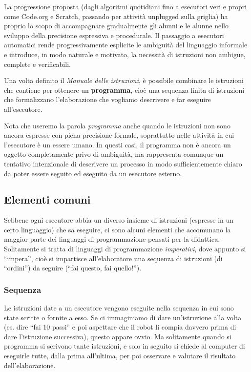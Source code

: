 La progressione proposta (dagli algoritmi quotidiani fino a esecutori veri e propri come Code.org e Scratch, passando per attività unplugged sulla griglia) ha proprio lo scopo di accompagnare gradualmente gli alunni e le alunne nello sviluppo della precisione espressiva e procedurale. Il passaggio a esecutori automatici rende progressivamente esplicite le ambiguità del linguaggio informale e introduce, in modo naturale e motivato, la necessità di istruzioni non ambigue, complete e verificabili.

Una volta definito il \emph{Manuale delle istruzioni}, è possibile combinare le istruzioni che contiene per ottenere un \textbf{programma}, cioè una sequenza finita di istruzioni che formalizzano l'elaborazione che vogliamo descrivere e far eseguire all'esecutore.

Nota che useremo la parola \textit{programma} anche quando le istruzioni non sono ancora espresse con piena precisione formale, soprattutto nelle attività in cui l'esecutore è un essere umano. In questi casi, il programma non è ancora un oggetto completamente privo di ambiguità, ma rappresenta comunque un tentativo intenzionale di descrivere un processo in modo sufficientemente chiaro da poter essere seguito ed eseguito da un esecutore esterno.

\subsection{Elementi comuni }\label{elementi-comuni}


Sebbene ogni esecutore abbia un diverso insieme di istruzioni (espresse in un certo linguaggio) che sa eseguire, ci sono alcuni elementi che accomunano la maggior parte dei linguaggi di programmazione pensati per la didattica. Solitamente si tratta di linguaggi di programmazione \emph{imperativi}, dove appunto si ``impera'', cioè si impartisce all'elaboratore una sequenza di istruzioni (di ``ordini'') da seguire (``fai questo, fai quello!'').

\subsubsection{Sequenza}


Le istruzioni date a un esecutore vengono eseguite nella sequenza in cui sono state scritte o fornite a esso. Se ci immaginiamo di dare un'istruzione alla volta (es. dire ``fai 10 passi'' e poi aspettare che il robot li compia davvero prima di dare l'istruzione successiva), questo appare ovvio. Ma solitamente quando si programma si scrivono tante istruzioni, e solo in seguito si chiede al computer di eseguirle tutte, dalla prima all'ultima, per poi osservare e valutare il risultato dell'elaborazione.



